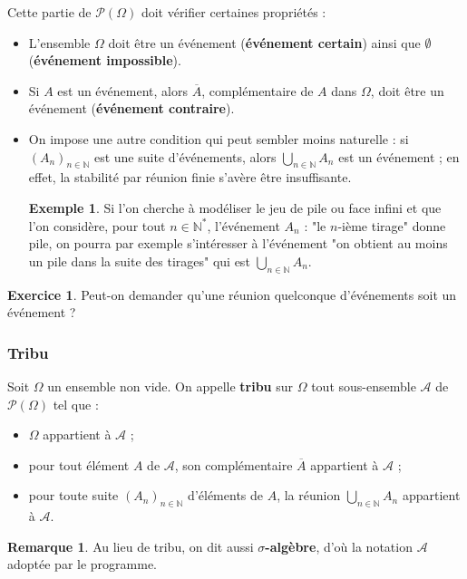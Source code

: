 \documentclass[french]{article}
\newcommand{\N}{\mathbb{N}}
\newcommand{\st}{^*}
\theoremstyle{plain}
\theoremstyle{definition}
\newtheorem*{ex}{Exemple}
\newtheorem{exo}{Exercice}
\newtheorem*{rmq}{Remarque}
\theoremstyle{remark}
\begin{document}
Cette partie de $\mathcal{P}(\Omega)$ doit vérifier certaines propriétés :
\begin{itemize}
	\item L'ensemble $\Omega$ doit être un événement (\textbf{événement certain}) ainsi que $\emptyset$ (\textbf{événement impossible}).
	\item Si $A$ est un événement, alors $\overline{A}$, complémentaire de $A$ dans $\Omega$, doit être un événement (\textbf{événement contraire}).
	\item On impose une autre condition qui peut sembler moins naturelle : si $(A_n)_{n\in\N}$ est une suite d'événements, alors $\displaystyle\bigcup_{n\in\N}A_n$ est un événement ; en effet, la stabilité par réunion finie s'avère être insuffisante.
	\begin{ex}
		Si l'on cherche à modéliser le jeu de pile ou face infini et que l'on considère, pour tout $n\in\N\st$, l'événement $A_n$ : "le $n$-ième tirage" donne pile, on pourra par exemple s'intéresser à l'événement "on obtient au moins un pile dans la suite des tirages" qui est $\displaystyle\bigcup_{n\in\N}A_n$.
	\end{ex}
\end{itemize}

\begin{exo}
	Peut-on demander qu'une réunion quelconque d'événements soit un événement ?
\end{exo}

\subsubsection*{Tribu}

\begin{dfn}
	Soit $\Omega$ un ensemble non vide. On appelle \textbf{tribu} sur $\Omega$ tout sous-ensemble $\mathcal{A}$ de $\mathcal{P}(\Omega)$ tel que :
	\begin{itemize}
		\item $\Omega$ appartient à $\mathcal{A}$ ;
		\item pour tout élément $A$ de $\mathcal{A}$, son complémentaire $\overline{A}$ appartient à $\mathcal{A}$ ;
		\item pour toute suite $(A_n)_{n\in\N}$ d'éléments de $A$, la réunion $\displaystyle\bigcup_{n\in\N}A_n$ appartient à $\mathcal{A}$.
	\end{itemize}
\end{dfn}

\begin{rmq}
	Au lieu de tribu, on dit aussi \textbf{$\sigma$-algèbre}, d'où la notation $\mathcal{A}$ adoptée par le programme.
\end{rmq}
\end{document}
